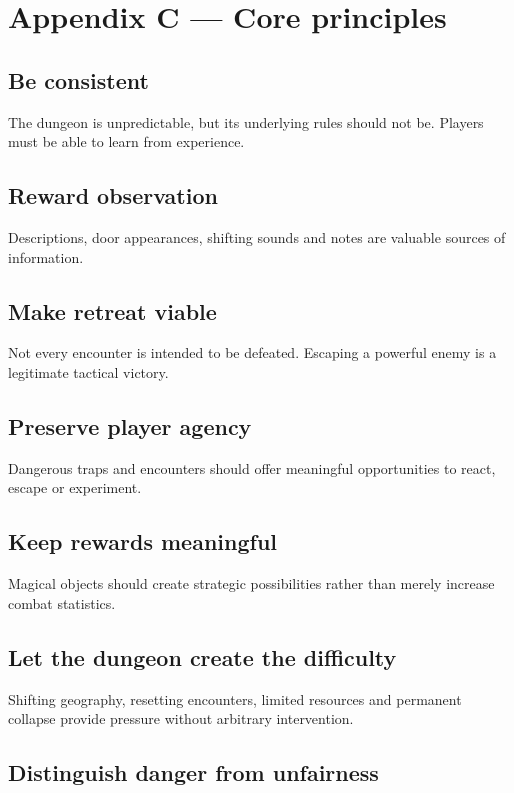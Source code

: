 \section{Appendix C — Core principles}

\subsection{Be consistent}

The dungeon is unpredictable, but its underlying rules should not be. Players must be able to learn from experience.

\subsection{Reward observation}

Descriptions, door appearances, shifting sounds and notes are valuable sources of information.

\subsection{Make retreat viable}

Not every encounter is intended to be defeated. Escaping a powerful enemy is a legitimate tactical victory.

\subsection{Preserve player agency}

Dangerous traps and encounters should offer meaningful opportunities to react, escape or experiment.

\subsection{Keep rewards meaningful}

Magical objects should create strategic possibilities rather than merely increase combat statistics.

\subsection{Let the dungeon create the difficulty}

Shifting geography, resetting encounters, limited resources and permanent collapse provide pressure without arbitrary intervention.

\subsection{Distinguish danger from unfairness}

